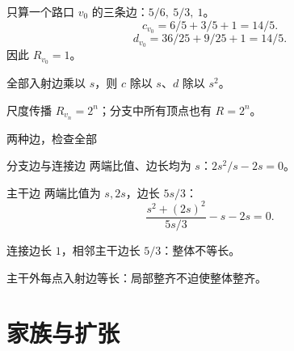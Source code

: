 \documentclass{beamer}
\begin{document}
\begin{frame}{只算一个路口}
$v_0$ 的三条边：$5/6,\ 5/3,\ 1$。
\[
c_{v_0}=6/5+3/5+1=14/5.
\]
\[
d_{v_0}=36/25+9/25+1=14/5.
\]
因此 $R_{v_0}=1$。

全部入射边乘以 $s$，则 $c$ 除以 $s$、$d$ 除以 $s^2$。
\begin{block}{尺度传播}
$R_{v_n}=2^n$；分支中所有顶点也有 $R=2^n$。
\end{block}
\end{frame}
\begin{frame}{两种边，检查全部}
\begin{block}{分支边与连接边}
两端比值、边长均为 $s$：$2s^2/s-2s=0$。
\end{block}
\begin{block}{主干边}
两端比值为 $s,2s$，边长 $5s/3$：
\[
\frac{s^2+(2s)^2}{5s/3}-s-2s=0.
\]
\end{block}
连接边长 $1$，相邻主干边长 $5/3$：整体不等长。

主干外每点入射边等长：局部整齐不迫使整体整齐。
\end{frame}
\section{家族与扩张}
\end{document}
